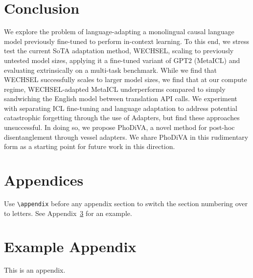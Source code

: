 \documentclass[11pt]{article}
\begin{document}
\section{Conclusion}

We explore the problem of language-adapting a monolingual causal language model previously
fine-tuned to perform in-context learning. To this end, we stress test the current SoTA adaptation
method, WECHSEL, scaling to previously untested model sizes, applying it a fine-tuned variant of
GPT2 (MetaICL) and evaluating extrinsically on a multi-task benchmark. While we find that WECHSEL
successfully scales to larger model sizes, we find that at our compute regime, WECHSEL-adapted
MetaICL underperforms compared to simply sandwiching the English model between translation API
calls. We experiment with separating ICL fine-tuning and language adaptation to address potential
catastrophic forgetting through the use of Adapters, but find these approaches unsuccessful. In
doing so, we propose PhoDiVA, a novel method for post-hoc disentanglement through vessel adapters.
We share PhoDiVA in this rudimentary form as a starting point for future work in this direction.



\section{Appendices}

Use \verb|\appendix| before any appendix section to switch the section numbering over to letters.
See Appendix~\ref{sec:appendix} for an example.

\appendix
\section{Example Appendix}
\label{sec:appendix}

This is an appendix.
\end{document}

